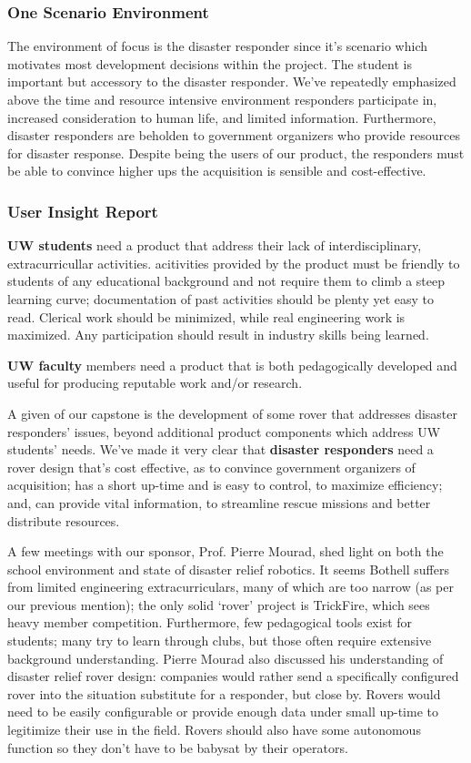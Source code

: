 \documentclass[a4paper, 10pt]{article}
\begin{document}
		\subsubsection*{One Scenario Environment}
		The environment of focus is the disaster responder since it's scenario which motivates most development decisions within the project. The student is important but accessory to the disaster responder. We've repeatedly emphasized above the time and resource intensive environment responders participate in, increased consideration to human life, and limited information. Furthermore, disaster responders are beholden to government organizers who provide resources for disaster response. Despite being the users of our product, the responders must be able to convince higher ups the acquisition is sensible and cost-effective.

		\subsubsection{User Insight Report}
		\textbf{UW students} need a product that address their lack of interdisciplinary, extracurricullar activities. acitivities provided by the product must be friendly to students of any educational background and not require them to climb a steep learning curve; documentation of past activities should be plenty yet easy to read. Clerical work should be minimized, while real engineering work is maximized. Any participation should result in industry skills being learned.
		
		\textbf{UW faculty} members need a product that is both pedagogically developed and useful for producing reputable work and/or research. 		
		
		A given of our capstone is the development of some rover that addresses disaster responders' issues, beyond additional product components which address UW students' needs. We've made it very clear that \textbf{disaster responders} need a rover design that's cost effective, as to convince government organizers of acquisition; has a short up-time and is easy to control, to maximize efficiency; and, can provide vital information, to streamline rescue missions and better distribute resources.
		
		A few meetings with our sponsor, Prof. Pierre Mourad, shed light on both the school environment and state of disaster relief robotics. It seems Bothell suffers from limited engineering extracurriculars, many of which are too narrow (as per our previous mention); the only solid `rover' project is TrickFire, which sees heavy member competition. Furthermore, few pedagogical tools exist for students; many try to learn through clubs, but those often require extensive background understanding. Pierre Mourad  also discussed his understanding of disaster relief rover design: companies would rather send a specifically configured rover into the situation substitute for a responder, but close by. Rovers would need to be easily configurable or provide enough data under small up-time to legitimize their use in the field. Rovers should also have some autonomous  function so they don't have to be babysat by their operators.
\end{document}
